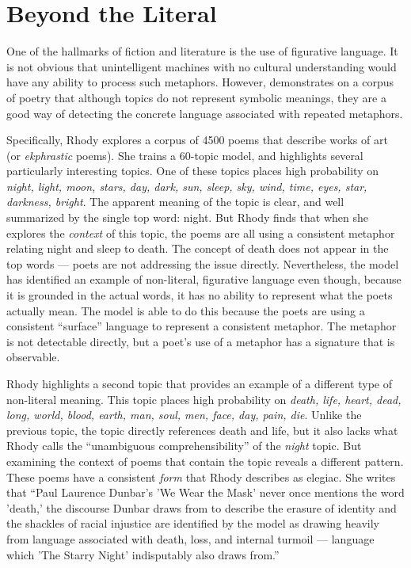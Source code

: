 \section{Beyond the Literal}

One of the hallmarks of fiction and literature is the use of figurative language.
It is not obvious that unintelligent machines with no cultural understanding would have any ability to process such metaphors. However, \citet{rhody-12} demonstrates on a corpus of poetry that although topics do not represent symbolic meanings, they are a good way of detecting the concrete language associated with repeated metaphors.

Specifically, Rhody explores a corpus of 4500 poems that describe works of art (or {\em ekphrastic} poems).
She trains a 60-topic model, and highlights several particularly interesting topics.
One of these topics places high probability on {\em night, light, moon, stars, day, dark, sun, sleep, sky, wind, time, eyes, star, darkness, bright}.
The apparent meaning of the topic is clear, and well summarized by the single top word: night.
But Rhody finds that when she explores the {\em context} of this topic, the poems are all using a consistent metaphor relating night and sleep to death.
The concept of death does not appear in the top words --- poets are not addressing the issue directly.
Nevertheless, the model has identified an example of non-literal, figurative language even though, because it is grounded in the actual words, it has no ability to represent what the poets actually mean.
The model is able to do this because the poets are using a consistent ``surface'' language to represent a consistent metaphor.
The metaphor is not detectable directly, but a poet's use of a metaphor has a signature that is observable.

Rhody highlights a second topic that provides an example of a different type of non-literal meaning.
This topic places high probability on {\em death, life, heart, dead, long, world, blood, earth, man, soul, men, face, day, pain, die}.
Unlike the previous topic, the topic directly references death and life, but it also lacks what Rhody calls the ``unambiguous comprehensibility'' of the {\em night} topic.
But examining the context of poems that contain the topic reveals a different pattern.
These poems have a consistent {\em form} that Rhody describes as elegiac.
She writes that ``Paul Laurence Dunbar's 'We Wear the Mask' never once mentions the word 'death,' the discourse Dunbar draws from to describe the erasure of identity and the shackles of racial injustice are identified by the model as drawing heavily from language associated with death, loss, and internal turmoil --- language which 'The Starry Night' indisputably also draws from.''

